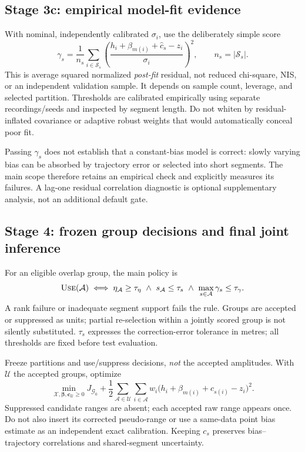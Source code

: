 \documentclass[conference]{IEEEtran}
\newcommand{\X}{\mathcal X}
\newcommand{\A}{\mathcal A}
\newcommand{\Sg}{\mathcal S}
\begin{document}
\subsection{Stage 3c: empirical model-fit evidence}
With nominal, independently calibrated $\sigma_i$, use the deliberately simple score
\begin{equation}
 \gamma_s=\frac{1}{n_s}\sum_{i\in\Sg_s}
       \left(\frac{h_i+\beta_{m(i)}+\hat c_s-z_i}{\sigma_i}\right)^2,
 \qquad n_s=|\Sg_s|.
 \label{eq:gamma}
\end{equation}
This is average squared normalized \emph{post-fit} residual, not reduced chi-square, NIS, or an independent validation sample. It depends on sample count, leverage, and selected partition. Thresholds are calibrated empirically using separate recordings/seeds and inspected by segment length. Do not whiten by residual-inflated covariance or adaptive robust weights that would automatically conceal poor fit.

Passing $\gamma_s$ does not establish that a constant-bias model is correct: slowly varying bias can be absorbed by trajectory error or selected into short segments. The main scope therefore retains an empirical check and explicitly measures its failures. A lag-one residual correlation diagnostic is optional supplementary analysis, not an additional default gate.

\subsection{Stage 4: frozen group decisions and final joint inference}
For an eligible overlap group, the main policy is
\begin{equation}
 \textsc{Use}(\A)\iff
 \eta_\A\geq\tau_\eta\ \land\ s_\A\leq\tau_s\
 \land\ \max_{s\in\A}\gamma_s\leq\tau_\gamma.
 \label{eq:policy}
\end{equation}
A rank failure or inadequate segment support fails the rule. Groups are accepted or suppressed as units; partial re-selection within a jointly scored group is not silently substituted. $\tau_s$ expresses the correction-error tolerance in metres; all thresholds are fixed before test evaluation.

Freeze partitions and use/suppress decisions, \emph{not} the accepted amplitudes. With $\mathcal U$ the accepted groups, optimize
\begin{equation}
 \min_{\X,\bm\beta,\mathbf c_{\mathcal U}\geq0}
 J_{\mathcal G_0}+\frac12\sum_{\A\in\mathcal U}\sum_{i\in\A}
 w_i\big(h_i+\beta_{m(i)}+c_{s(i)}-z_i\big)^2.
 \label{eq:final}
\end{equation}
Suppressed candidate ranges are absent; each accepted raw range appears once. Do not also insert its corrected pseudo-range or use a same-data point bias estimate as an independent exact calibration. Keeping $c_s$ preserves bias--trajectory correlations and shared-segment uncertainty.
\end{document}
